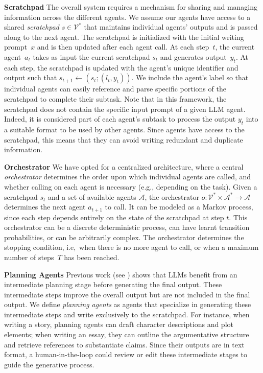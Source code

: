 \documentclass{article}
\begin{document}
\textbf{Scratchpad} 
The overall system requires a mechanism for sharing and managing
information across the different agents.  We assume our agents have
access to a shared {\it scratchpad} $s \in \mathcal{V}^*$ that
maintains individual agents' outputs and is passed along to the next
agent. The scratchpad is initialized with the initial writing
prompt~$x$ and is then updated after each agent call. At each
step~$t$, the current agent~$a_t$ takes as input the current
scratchpad $s_t$ and generates output~$y_t$. At each step, the
scratchpad is updated with the agent's unique identifier and output
such that $s_{t+1} \gets (s_t; (l_t, y_t))$. We include the agent's
label so that individual agents can easily reference and parse
specific portions of the scratchpad to complete their subtask.  Note
that in this framework, the scratchpad does not contain the specific
input prompt of a given LLM agent. Indeed, it is considered part of
each agent's subtask to process the output $y_t$ into a suitable
format to be used by other agents. Since agents have access to the
scratchpad, this means that they can avoid writing redundant and
duplicate information.

\textbf{Orchestrator} We have opted for a centralized architecture, where a central {\it orchestrator} determines the order upon which individual agents are called, and whether calling on each agent is necessary (e.g., depending on the task). Given a scratchpad $s_t$ and a set of available agents $\mathcal{A}$, the orchestrator $o: \mathcal{V}^* \times \mathcal{A}^* \to \mathcal{A}$ determines the next agent $a_{t+1}$ to call. It can be modeled as a Markov process, since each step depends entirely on the state of the scratchpad at step $t$. This orchestrator can be a discrete deterministic process, can have learnt transition probabilities, or can be arbitrarily complex. The orchestrator determines the stopping condition, i.e,~when there is no more agent to call, or when a maximum number of steps~$T$ has been reached.




\textbf{Planning Agents} Previous work (see ) shows that LLMs benefit from an intermediate planning stage before generating the final output. 
These intermediate steps improve the overall output but are not included in the final output. We define {\it planning agents} as agents that specialize in generating these intermediate steps and write exclusively to the scratchpad.  For instance, when writing a story,  planning agents can draft character descriptions and plot elements; when writing an essay, they can outline the argumentative structure and retrieve references to substantiate claims. 
Since their outputs are in text format, a human-in-the-loop could review or edit these intermediate stages to guide the generative process.
\end{document}
